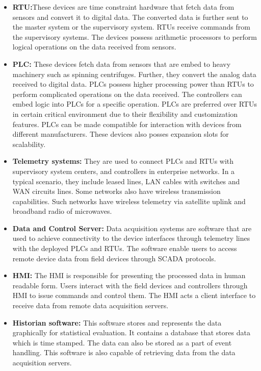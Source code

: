 \documentclass[article,msc=informatik,type=msc,colorback,accentcolor=tud9c]{tudthesis}
\begin{document}
	\begin{itemize}


	\item\textbf{\ac{RTU}:}These devices are time constraint hardware  that fetch data from sensors and convert it to digital data. The converted data is further sent to the master system or the supervisory system. \ac{RTU}s receive commands from the supervisory systems. The devices possess arithmetic processors to perform logical operations on the data received from sensors.
	


	\item\textbf{\ac{PLC}:}
	These devices fetch data from sensors that are embed to heavy machinery such as spinning centrifuges. Further, they convert the analog data received to digital data. \ac{PLC}s possess higher processing power than \ac{RTU}s to perform complicated operations on the data received. The controllers can embed logic into \ac{PLC}s for a specific operation.
	\ac{PLC}s are preferred over \ac{RTU}s in certain critical environment due to their flexibility and customization features. \ac{PLC}s can be made compatible for interaction with devices from different manufacturers. These devices also posses expansion slots for scalability. 
	
	
	

	\item\textbf{Telemetry systems:} They are used to connect \ac{PLC}s and \ac{RTU}s with supervisory system centers, and controllers in enterprise networks. In a typical scenario, they include leased lines, LAN cables with switches and  \ac{WAN} circuits lines. Some networks also have wireless transmission capabilities. Such networks have wireless telemetry via satellite uplink and broadband radio of microwaves. 
	
	

	\item\textbf{Data and Control Server:} Data acquisition systems are software that are used to achieve connectivity to the device interfaces through telemetry lines with the deployed \ac{PLC}s and \ac{RTU}s. The software enable users to access remote device data from field devices through \ac{SCADA} protocols.
	
	
	
	\item\textbf{\ac{HMI}:} The \ac{HMI} is responsible for presenting the processed data in human readable form. Users interact with the field devices and controllers through \ac{HMI} to issue commands and control them. The \ac{HMI} acts a client interface to receive data from remote data acquisition servers. 
	
	
	
	\item\textbf{Historian software:} This software stores and represents the data graphically for statistical evaluation. It contains a database that stores data which is time stamped. The data can also be stored as a part of event handling. This software is also capable of retrieving data from the data acquisition servers.
	



	\end{itemize}
\end{document}
